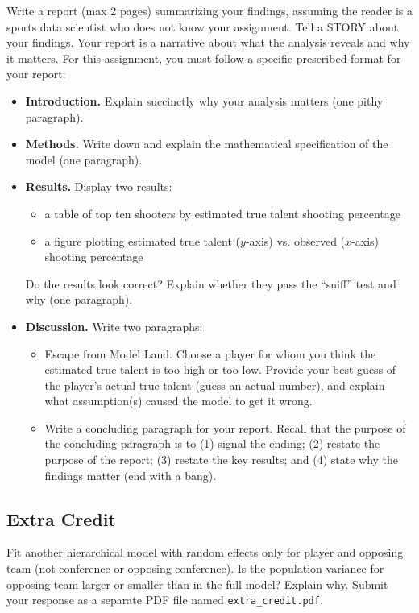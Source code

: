 \documentclass{article}
\begin{document}
      Write a report (max 2 pages) summarizing your findings, assuming the reader is a sports data scientist who does not know your assignment. Tell a STORY about your findings. Your report is a narrative about what the analysis reveals and why it matters. For this assignment, you must follow a specific prescribed format for your report:
      \begin{itemize}
        \item {\bf Introduction.} Explain succinctly why your analysis matters (one pithy paragraph).
        \item {\bf Methods.} Write down and explain the mathematical specification of the model (one paragraph).
        \item {\bf Results.} Display two results:
        \begin{itemize}
          \item a table of top ten shooters by estimated true talent shooting percentage
          \item a figure plotting estimated true talent ($y$-axis) vs. observed ($x$-axis) shooting percentage
        \end{itemize}
        Do the results look correct? Explain whether they pass the ``sniff'' test and why (one paragraph).
        \item {\bf Discussion.} Write two paragraphs:
        \begin{itemize}
          \item Escape from Model Land. Choose a player for whom you think the estimated true talent is too high or too low. Provide your best guess of the player's actual true talent (guess an actual number), and explain what assumption(s) caused the model to get it wrong.
          \item Write a concluding paragraph for your report. Recall that the purpose of the concluding paragraph is to (1) signal the ending; (2) restate the purpose of the report; (3) restate the key results; and (4) state why the findings matter (end with a bang).
        \end{itemize}
      \end{itemize}

      \subsection*{\sc Extra Credit}

        Fit another hierarchical model with random effects only for player and opposing team (not conference or opposing conference). Is the population variance for opposing team larger or smaller than in the full model? Explain why. Submit your response as a separate PDF file named \texttt{extra\_credit.pdf}.
\end{document}

